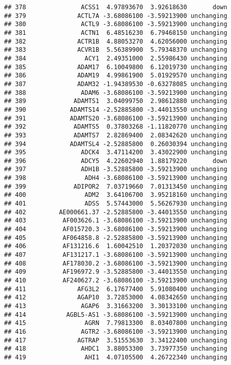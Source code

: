 \documentclass[]{article}
\begin{document}
\begin{verbatim}
## 378               ACSS1  4.97893670  3.92618630       down
## 379              ACTL7A -3.68086100 -3.59213900 unchanging
## 380               ACTL9 -3.68086100 -3.59213900 unchanging
## 381               ACTN1  6.48516230  6.79468150 unchanging
## 382              ACTR1B  4.88053270  4.62056000 unchanging
## 383              ACVR1B  5.56389900  5.79348370 unchanging
## 384                ACY1  2.49351000  2.55986430 unchanging
## 385              ADAM17  6.10049800  6.12019730 unchanging
## 386              ADAM19  4.99861900  5.01929570 unchanging
## 387              ADAM32 -1.94389530 -0.63278085 unchanging
## 388               ADAM6 -3.68086100 -3.59213900 unchanging
## 389             ADAMTS1  3.04099750  2.98612880 unchanging
## 390            ADAMTS14 -2.52885800 -3.44013550 unchanging
## 391            ADAMTS20 -3.68086100 -3.59213900 unchanging
## 392             ADAMTS5  0.37803268 -1.11820770 unchanging
## 393             ADAMTS7  2.82869400  2.08342620 unchanging
## 394            ADAMTSL4 -2.52885800  0.26030394 unchanging
## 395               ADCK4  3.47114200  3.43022900 unchanging
## 396               ADCY5  4.22602940  1.88179220       down
## 397               ADH1B -3.52885800 -3.59213900 unchanging
## 398                ADH4 -3.68086100 -3.59213900 unchanging
## 399             ADIPOR2  7.03719660  7.01313450 unchanging
## 400                ADM2  3.64106700  3.95218160 unchanging
## 401                ADSS  5.57443000  5.56267930 unchanging
## 402         AE000661.37 -2.52885800 -3.44013550 unchanging
## 403          AF003626.1 -3.68086100 -3.59213900 unchanging
## 404          AF015720.3 -3.68086100 -3.59213900 unchanging
## 405          AF064858.8 -2.52885800 -3.59213900 unchanging
## 406          AF131216.6  1.60042510  1.20372030 unchanging
## 407          AF131217.1 -3.68086100 -3.59213900 unchanging
## 408          AF178030.2 -3.68086100 -3.59213900 unchanging
## 409          AF196972.9 -3.52885800 -3.44013550 unchanging
## 410          AF240627.2 -3.68086100 -3.59213900 unchanging
## 411              AFG3L2  6.17677400  5.91080400 unchanging
## 412              AGAP10  3.72853000  4.08342650 unchanging
## 413               AGAP6  3.31663200  3.30133100 unchanging
## 414           AGBL5-AS1 -3.68086100 -3.59213900 unchanging
## 415                AGRN  7.79813300  8.03407800 unchanging
## 416               AGTR2 -3.68086100 -3.59213900 unchanging
## 417              AGTRAP  3.51553630  3.34122400 unchanging
## 418               AHDC1  3.88053300  3.73977350 unchanging
## 419                AHI1  4.07105500  4.26722340 unchanging

\end{verbatim}
\end{document}
